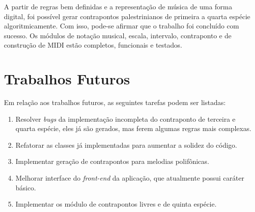   A partir de regras bem definidas e a representação de música de uma forma digital, foi possível gerar contrapontos palestrinianos de primeira a quarta espécie algoritmicamente. Com isso, pode-se afirmar que o trabalho foi concluído com sucesso. Os módulos de notação musical, escala, intervalo, contraponto e de construção de MIDI estão completos, funcionais e testados.

  \section[Trabalhos Futuros]{Trabalhos Futuros}

    Em relação aos trabalhos futuros, as seguintes tarefas podem ser listadas:

    \begin{enumerate}
      \item Resolver \textit{bugs} da implementação incompleta do contraponto de terceira e quarta espécie, eles já são gerados, mas ferem algumas regras mais complexas.
      \item Refatorar as classes já implementadas para aumentar a solidez do código.
      \item Implementar geração de contrapontos para melodias polifônicas.
      \item Melhorar interface do \textit{front-end} da aplicação, que atualmente possui caráter básico.
      \item Implementar os módulo de contrapontos livres e de quinta espécie.
    \end{enumerate}
